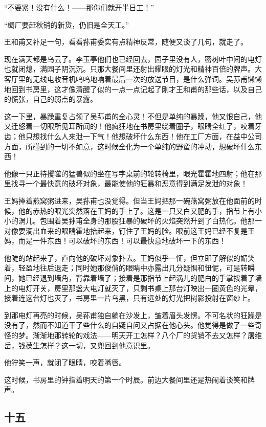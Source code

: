 \par “不要紧！没有什么！——那你们就开半日工！”
\par “绸厂要赶秋销的新货，仍旧是全天工。”
\par 王和甫又补足一句，看看荪甫委实有点精神反常，随便又谈了几句，就走了。
\par 现在满天都是乌云了。李玉亭他们也已经回去，园子里没有人，密树叶中间的电灯也就闭熄，满园子阴沉沉。只那大餐间里还射出耀眼的灯光和精神百倍的牌声。大客厅里的无线电收音机呜呜地响着最后一次的放送节目，是什么弹词。吴荪甫懒懒地回到书房里，这才像清醒了似的一点一点记起了刚才王和甫的那些话，以及自己的慌张，自己的弱点的暴露。
\par 这一下里，暴躁重复占领了吴荪甫的全心灵！不但是单纯的暴躁，他又恨自己，他又迁怒着一切眼所见耳所闻的！他疯狂地在书房里绕着圈子，眼睛全红了，咬着牙齿；他只想找什么人来泄一下气！他想破坏什么东西！他在工厂方面，在益中公司方面，所碰到的一切不如意，这时候全化为一个单纯的野蛮的冲动，想破坏什么东西！
\par 他像一只正待攫噬的猛兽似的坐在写字桌前的轮转椅里，眼光霍霍地四射；他在那里找寻一个最快意的破坏对象，最能使他的狂暴和恶意得到满足发泄的对象！
\par 王妈捧着燕窝粥进来，吴荪甫也没觉得。但当王妈把那一碗燕窝粥放在他面前的时候，他的赤热的眼光突然落在王妈的手上了。这是一只又白又肥的手，指节上有小小的涡儿。包围着吴荪甫全身的那股狂暴的破坏的火焰突然升到了白热化。他那一对像要滴出血来的眼睛霍地抬起来，钉住了王妈的脸。眼前这王妈已经不复是王妈，而是一件东西！可以破坏的东西！可以最快意地破坏一下的东西！
\par 他陡的站起来了，直向他的破坏对象扑去。王妈似乎一怔，但立即了解似的媚笑着，轻盈地往后退走；同时她那俊俏的眼睛中亦露出几分疑惧和忸怩，可是转瞬间，她已经退到墙角，背靠着墙了；接着是那指节上起涡儿的肥白的手掌按着了墙上的电灯开关，房里那盏大电灯就灭了，只剩书桌上那台灯映出一圈黄色的光晕，接着连这台灯也灭了，书房里一片乌黑，只有远处的灯光把树影投射在窗纱上。
\par 到那电灯再亮的时候，吴荪甫独自躺在沙发上，皱着眉头发愣。不可名状的狂躁是没有了，然而不知道干了些什么的自疑自问又占据在他心头。他觉得是做了一些奇怪的梦。渐渐地那转轮的戏法——明天开工怎样？八个厂的货销不去又怎样？屠维岳，钱葆生怎样？这一切，又兜回到他意识里。
\par 他狞笑一声，就闭了眼睛，咬着嘴唇。
\par 这时候，书房里的钟指着明天的第一个时辰。前边大餐间里还是热闹着谈笑和牌声。



\subsection*{十五}


